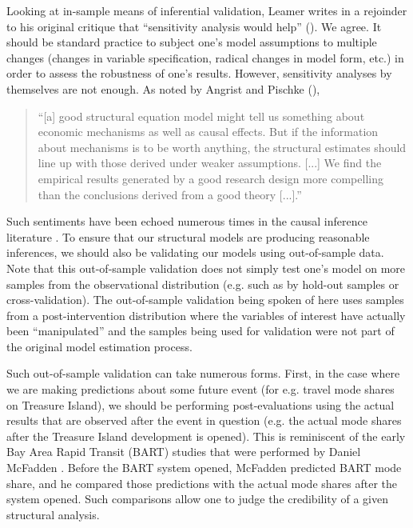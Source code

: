 Looking at in-sample means of inferential validation, Leamer writes in a rejoinder to his original critique that ``sensitivity analysis would help'' (\citeyear{leamer1985sensitivity}). We agree. It should be standard practice to subject one's model assumptions to multiple changes (changes in variable specification, radical changes in model form, etc.) in order to assess the robustness of one's results. However, sensitivity analyses by themselves are not enough. As noted by Angrist and Pischke (\citeyear{angrist2010credibility}),
\begin{quotation}
``[a] good structural equation model might tell us something about economic mechanisms as well as causal effects. But if the information about mechanisms is to be worth anything, the structural estimates should line up with those derived under weaker assumptions. [...] We find the empirical results generated by a good research design more compelling than the conclusions derived from a good theory [...].''
\end{quotation}
Such sentiments have been echoed numerous times in the causal inference literature \citep[for e.g.][]{hendry1980econometrics, lalonde1986evaluating}. To ensure that our structural models are producing reasonable inferences, we should also be validating our models using out-of-sample data. Note that this out-of-sample validation does not simply test one's model on more samples from the observational distribution (e.g. such as by hold-out samples or cross-validation). The out-of-sample validation being spoken of here uses samples from a post-intervention distribution where the variables of interest have actually been ``manipulated'' and the samples being used for validation were not part of the original model estimation process.

Such out-of-sample validation can take numerous forms. First, in the case where we are making predictions about some future event (for e.g. travel mode shares on Treasure Island), we should be performing post-evaluations using the actual results that are observed after the event in question (e.g. the actual mode shares after the Treasure Island development is opened). This is reminiscent of the early Bay Area Rapid Transit (BART) studies that were performed by Daniel McFadden \citep{mcfadden1974measurement, mcfadden2000disaggregate}. Before the BART system opened, McFadden predicted BART mode share, and he compared those predictions with the actual mode shares after the system opened. Such comparisons allow one to judge the credibility of a given structural analysis.

